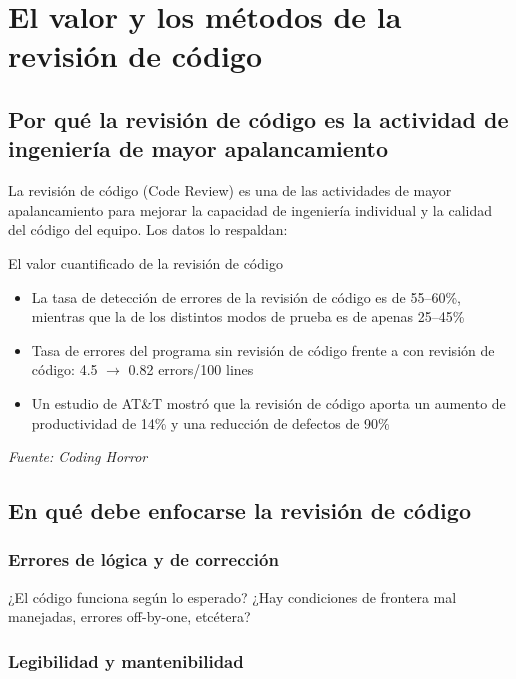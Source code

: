 \section{El valor y los métodos de la revisión de código}

\subsection{Por qué la revisión de código es la actividad de ingeniería de mayor apalancamiento}

La revisión de código (Code Review) es una de las actividades de mayor apalancamiento para mejorar la capacidad de ingeniería individual y la calidad del código del equipo. Los datos lo respaldan:

\begin{importantbox}{El valor cuantificado de la revisión de código}
\begin{itemize}
    \item La tasa de detección de errores de la revisión de código es de 55--60\%, mientras que la de los distintos modos de prueba es de apenas 25--45\%
    \item Tasa de errores del programa sin revisión de código frente a con revisión de código: 4.5 $\rightarrow$ 0.82 errors/100 lines
    \item Un estudio de AT\&T mostró que la revisión de código aporta un aumento de productividad de 14\% y una reducción de defectos de 90\%
\end{itemize}
\textit{Fuente: Coding Horror}
\end{importantbox}

\subsection{En qué debe enfocarse la revisión de código}

\subsubsection{Errores de lógica y de corrección}

¿El código funciona según lo esperado? ¿Hay condiciones de frontera mal manejadas, errores off-by-one, etcétera?

\subsubsection{Legibilidad y mantenibilidad}

